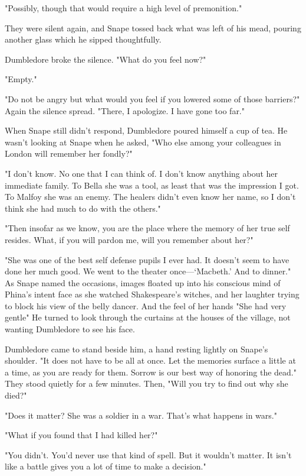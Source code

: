 "Possibly, though that would require a high level of premonition."

They were silent again, and Snape tossed back what was left of his mead, pouring another glass which he sipped thoughtfully.

Dumbledore broke the silence. "What do you feel now?"

"Empty."

"Do not be angry{\el} but what would you feel if you lowered some of those barriers?" Again the silence spread. "There, I apologize. I have gone too far."

When Snape still didn't respond, Dumbledore poured himself a cup of tea. He wasn't looking at Snape when he asked, "Who else among your colleagues in London will remember her fondly?"

"I don't know. No one that I can think of. I don't know anything about her immediate family. To Bella she was a tool, as least that was the impression I got. To Malfoy she was an enemy. The healers didn't even know her name, so I don't think she had much to do with the others."

"Then insofar as we know, you are the place where the memory of her true self resides. What, if you will pardon me, will you remember about her?"

"She was one of the best self defense pupils I ever had. It doesn't seem to have done her much good. We went to the theater once—`Macbeth.' And to dinner." As Snape named the occasions, images floated up into his conscious mind of Phina's intent face as she watched Shakespeare's witches, and her laughter trying to block his view of the belly dancer. And the feel of her hands{\el} "She had very gentle{\el}" He turned to look through the curtains at the houses of the village, not wanting Dumbledore to see his face.

Dumbledore came to stand beside him, a hand resting lightly on Snape's shoulder. "It does not have to be all at once. Let the memories surface a little at a time, as you are ready for them. Sorrow is our best way of honoring the dead." They stood quietly for a few minutes. Then, "Will you try to find out why she died?"

"Does it matter? She was a soldier in a war. That's what happens in wars."

"What if you found that I had killed her?"

"You didn't. You'd never use that kind of spell. But it wouldn't matter. It isn't like a battle gives you a lot of time to make a decision."


